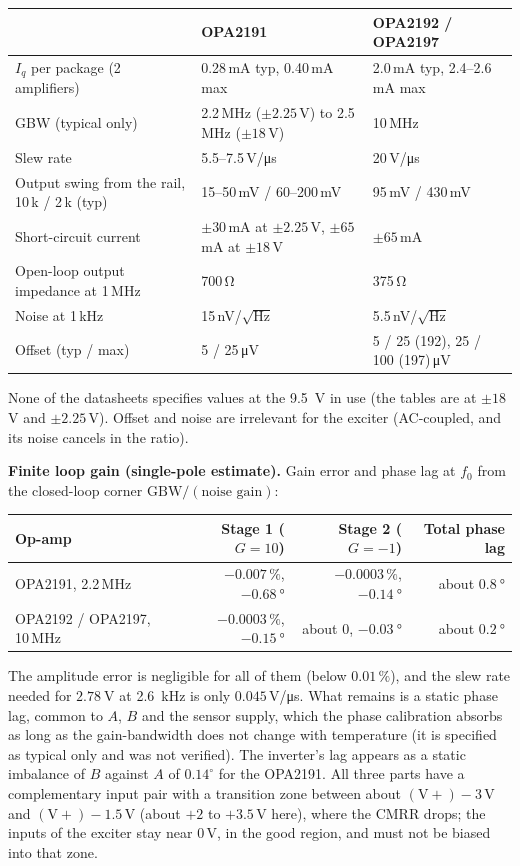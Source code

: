 \documentclass[11pt,a4paper]{article}
\begin{document}
\begin{center}
\small
\begin{tabular}{@{}p{4.6cm}p{5.4cm}p{5.0cm}@{}}
\toprule
 & OPA2191 & OPA2192 / OPA2197 \\
\midrule
$I_q$ per package (2 amplifiers) & 0.28\,mA typ, 0.40\,mA max & 2.0\,mA typ, 2.4--2.6\,mA max \\
GBW (typical only) & 2.2\,MHz ($\pm2.25$\,V) to 2.5\,MHz ($\pm18$\,V) & 10\,MHz \\
Slew rate & 5.5--7.5\,V/\si{\micro\second} & 20\,V/\si{\micro\second} \\
Output swing from the rail, 10\,k / 2\,k (typ) & 15--50\,mV / 60--200\,mV & 95\,mV / 430\,mV \\
Short-circuit current & $\pm30$\,mA at $\pm2.25$\,V, $\pm65$\,mA at $\pm18$\,V & $\pm65$\,mA \\
Open-loop output impedance at 1\,MHz & 700\,\si{\ohm} & 375\,\si{\ohm} \\
Noise at 1\,kHz & 15\,nV/$\sqrt{\mathrm{Hz}}$ & 5.5\,nV/$\sqrt{\mathrm{Hz}}$ \\
Offset (typ / max) & 5 / 25\,\si{\micro\volt} & 5 / 25 (192), 25 / 100 (197)\,\si{\micro\volt} \\
\bottomrule
\end{tabular}
\end{center}
None of the datasheets specifies values at the \SI{9.5}{\volt} in use (the tables are at
$\pm18$\,V and $\pm2.25$\,V).  Offset and noise are irrelevant for the exciter (AC-coupled,
and its noise cancels in the ratio).

\textbf{Finite loop gain (single-pole estimate).}  Gain error and phase lag at $f_0$ from the
closed-loop corner $\mathrm{GBW}/(\text{noise gain})$:
\begin{center}
\small
\begin{tabular}{@{}lrrr@{}}
\toprule
Op-amp & Stage 1 ($G=10$) & Stage 2 ($G=-1$) & Total phase lag \\
\midrule
OPA2191, 2.2\,MHz & $-0.007\,\%$, $\SI{-0.68}{\degree}$ & $-0.0003\,\%$, $\SI{-0.14}{\degree}$ & about $\SI{0.8}{\degree}$ \\
OPA2192 / OPA2197, 10\,MHz & $-0.0003\,\%$, $\SI{-0.15}{\degree}$ & about 0, $\SI{-0.03}{\degree}$ & about $\SI{0.2}{\degree}$ \\
\bottomrule
\end{tabular}
\end{center}
The amplitude error is negligible for all of them (below $0.01\,\%$), and the slew rate needed
for $\SI{2.78}{\volt}$ at \SI{2.6}{\kilo\hertz} is only $0.045$\,V/\si{\micro\second}.  What remains is a
static phase lag, common to $A$, $B$ and the sensor supply, which the phase calibration
absorbs as long as the gain-bandwidth does not change with temperature (it is specified as
typical only and was not verified).  The inverter's lag appears as a static imbalance of $B$
against $A$ of $0.14^{\circ}$ for the OPA2191.  All three parts have a complementary input pair
with a transition zone between about $(\mathrm{V}+)-3\,\mathrm{V}$ and $(\mathrm{V}+)-1.5\,\mathrm{V}$ (about $+2$
to $+3.5$\,V here), where the CMRR drops; the inputs of the exciter stay near 0\,V, in the
good region, and must not be biased into that zone.
\end{document}
